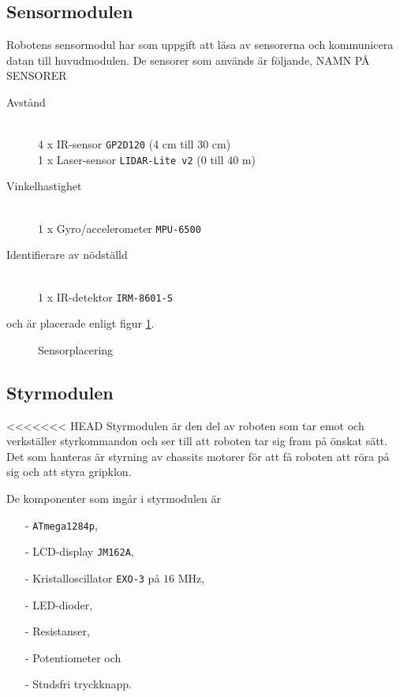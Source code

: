 \documentclass[11pt]{article}
\begin{document}
\begin{flushleft}
\subsection{Sensormodulen}
Robotens sensormodul har som uppgift att läsa av sensorerna och kommunicera datan till huvudmodulen. De sensorer som används är följande, NAMN PÅ SENSORER
\begin{description}
	\item[Avstånd] \hfill \\
	4 x IR-sensor \verb+GP2D120+ (4 cm till 30 cm) \\
	1 x Laser-sensor \verb+LIDAR-Lite v2+ (0 till 40 m) \\
	\item[Vinkelhastighet] \hfill \\
	1 x Gyro/accelerometer \verb+MPU-6500+ 
	\item[Identifierare av nödställd] \hfill \\
	1 x IR-detektor \verb+IRM-8601-S+
\end{description}
och är placerade enligt figur \ref{sensors}. 

\begin{figure}[htbp]
\centering
\noindent\resizebox{.8\textwidth}{!}{
		}
	\caption{Sensorplacering \label{sensors}}
\end{figure}

\subsection{Styrmodulen}
<<<<<<< HEAD
Styrmodulen är den del av roboten som tar emot och verkställer styrkommandon och ser till att roboten tar sig fram på önskat sätt. Det som hanteras är styrning av chassits motorer för att få roboten att röra på sig och att styra gripklon. 

De komponenter som ingår i styrmodulen är
\begin{itemize}
  \item[-] \verb+ATmega1284p+,
  \item[-] LCD-display \verb+JM162A+,
  \item[-] Kristalloscillator \verb+EXO-3+ på $16$ MHz,
  \item[-] LED-dioder, 
  \item[-] Resistanser,
  \item[-] Potentiometer och
  \item[-] Studsfri tryckknapp.
\end{itemize}


\end{flushleft}
\end{document}
